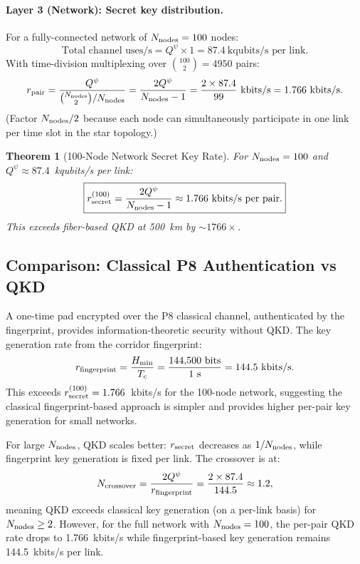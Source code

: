 \documentclass[aps,prd,twocolumn,superscriptaddress,nofootinbib]{revtex4-2}
\newcommand{\Hmin}{H_{\min}}
\newtheorem{theorem}{Theorem}
\begin{document}
\paragraph{Layer 3 (Network): Secret key distribution.}
For a fully-connected network of $N_{\rm nodes} = 100$ nodes:
\begin{equation}
\text{Total channel uses/s} = Q^\psi \times 1 = 87.4~\text{kqubits/s per link}.
\end{equation}
With time-division multiplexing over $\binom{100}{2} = 4950$ pairs:
\begin{equation}
r_{\rm pair} = \frac{Q^\psi}{\binom{N_{\rm nodes}}{2}/N_{\rm nodes}}
= \frac{2 Q^\psi}{N_{\rm nodes} - 1}
= \frac{2 \times 87.4}{99}~\text{kbits/s} = 1.766~\text{kbits/s}.
\label{eq:r-pair}
\end{equation}
(Factor $N_{\rm nodes}/2$ because each node can simultaneously participate
in one link per time slot in the star topology.)

\begin{theorem}[100-Node Network Secret Key Rate]
For $N_{\rm nodes} = 100$ and $Q^\psi \approx 87.4$~kqubits/s per link:
\begin{equation}
\boxed{r_{\rm secret}^{(100)} = \frac{2 Q^\psi}{N_{\rm nodes} - 1}
\approx 1.766~\text{kbits/s per pair.}}
\label{eq:r-100}
\end{equation}
This exceeds fiber-based QKD at 500~km by $\sim 1766\times$.
\end{theorem}

\subsection{Comparison: Classical P8 Authentication vs QKD}

A one-time pad encrypted over the P8 classical channel, authenticated
by the fingerprint, provides information-theoretic security without QKD.
The key generation rate from the corridor fingerprint:
\begin{equation}
r_{\rm fingerprint} = \frac{\Hmin}{T_c}
= \frac{144{,}500~\text{bits}}{1~\text{s}} = 144.5~\text{kbits/s}.
\end{equation}
This exceeds $r_{\rm secret}^{(100)} = 1.766$~kbits/s for the 100-node network,
suggesting the classical fingerprint-based approach is simpler and provides
higher per-pair key generation for small networks.

For large $N_{\rm nodes}$, QKD scales better: $r_{\rm secret}$ decreases
as $1/N_{\rm nodes}$, while fingerprint key generation is fixed per link.
The crossover is at:
\begin{equation}
N_{\rm crossover} = \frac{2 Q^\psi}{r_{\rm fingerprint}}
= \frac{2 \times 87.4}{144.5} \approx 1.2,
\end{equation}
meaning QKD exceeds classical key generation (on a per-link basis) for
$N_{\rm nodes} \geq 2$. However, for the full network with $N_{\rm nodes} = 100$,
the per-pair QKD rate drops to 1.766~kbits/s while fingerprint-based
key generation remains 144.5~kbits/s per link.
\end{document}
